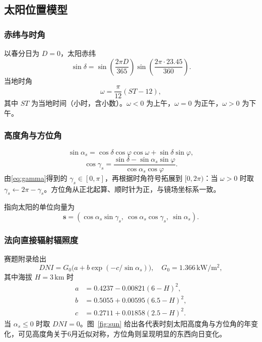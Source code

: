 \documentclass[withoutpreface,bwprint]{cumcmthesis}
\begin{document}
\subsection{太阳位置模型}
\subsubsection{赤纬与时角}
以春分日为 $D=0$，太阳赤纬
\begin{equation}
\sin\delta=\sin\!\left(\frac{2\pi D}{365}\right)\sin\!\left(\frac{2\pi\cdot23.45}{360}\right).
\label{eq:delta}
\end{equation}
当地时角
\begin{equation}
\omega=\frac{\pi}{12}(ST-12),
\label{eq:omega}
\end{equation}
其中 $ST$ 为当地时间（小时，含小数）。$\omega<0$ 为上午，$\omega=0$ 为正午，$\omega>0$ 为下午。

\subsubsection{高度角与方位角}
\begin{equation}
\sin\alpha_s=\cos\delta\cos\varphi\cos\omega+\sin\delta\sin\varphi,
\label{eq:alpha}
\end{equation}
\begin{equation}
\cos\gamma_s=\frac{\sin\delta-\sin\alpha_s\sin\varphi}{\cos\alpha_s\cos\varphi}.
\label{eq:gamma}
\end{equation}
由\eqref{eq:gamma}得到的 $\gamma_s\in[0,\pi]$，再根据时角符号拓展到 $[0,2\pi)$：当 $\omega>0$ 时取 $\gamma_s\leftarrow 2\pi-\gamma_s$。方位角从正北起算、顺时针为正，与镜场坐标系一致。

指向太阳的单位向量为
\begin{equation}
\boldsymbol{s}=(\cos\alpha_s\sin\gamma_s,\ \cos\alpha_s\cos\gamma_s,\ \sin\alpha_s).
\label{eq:s}
\end{equation}

\subsubsection{法向直接辐射辐照度}
赛题附录给出
\begin{equation}
DNI=G_0\bigl(a+b\exp(-c/\sin\alpha_s)\bigr),\quad G_0=1.366\,\mathrm{kW/m^2},
\label{eq:dni}
\end{equation}
其中海拔 $H=3\,\mathrm{km}$ 时
\begin{align}
a&=0.4237-0.00821(6-H)^2,\\
b&=0.5055+0.00595(6.5-H)^2,\\
c&=0.2711+0.01858(2.5-H)^2.
\end{align}
当 $\alpha_s\le0$ 时取 $DNI=0$。图~\ref{fig:sun} 给出各代表时刻太阳高度角与方位角的年变化，可见高度角关于6月近似对称，方位角则呈现明显的东西向日变化。
\end{document}
